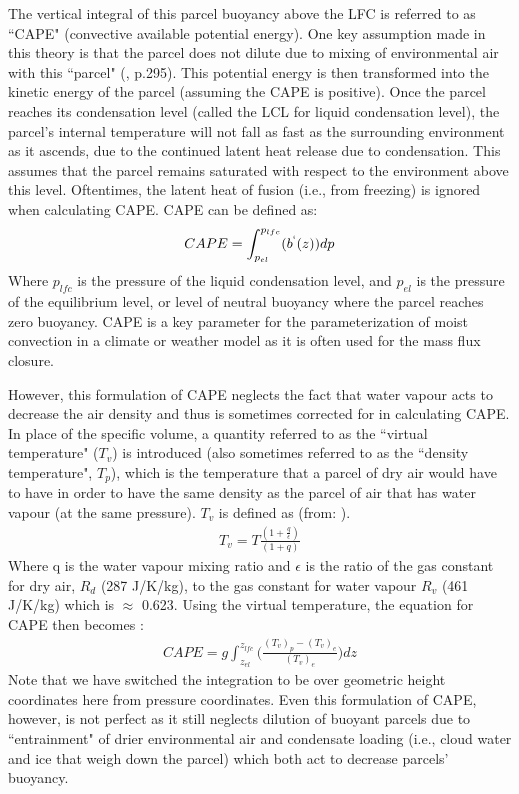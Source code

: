 \documentclass[letterpaper,12pt,titlepage,oneside,final]{book}
\begin{document}
The vertical integral of this parcel buoyancy above the LFC is referred to as ``CAPE" (convective available potential energy). One key assumption made in this theory is that the parcel does not dilute due to mixing of environmental air with this ``parcel" (\citep{holton_introduction_2004}, p.295). This potential energy is then transformed into the kinetic energy of the parcel (assuming the CAPE is positive). Once the parcel reaches its condensation level (called the LCL for liquid condensation level), the parcel's internal temperature will not fall as fast as the surrounding environment as it ascends, due to the continued latent heat release due to condensation. This assumes that the parcel remains saturated with respect to the environment above this level. Oftentimes, the latent heat of fusion (i.e., from freezing) is ignored when calculating CAPE. CAPE can be defined as: 
\begin{align}
CAPE=\int_{p_{el}}^{p_{lfc}}(b^{`}(z)){dp}
\end{align}
Where $p_{lfc}$ is the pressure of the liquid condensation level, and $p_{el}$ is the pressure of the equilibrium level, or level of neutral buoyancy where the parcel reaches zero buoyancy. CAPE is a key parameter for the parameterization of moist convection in a climate or weather model as it is often used for the mass flux closure. 

However, this formulation of CAPE neglects the fact that water vapour acts to decrease the air density and thus is sometimes corrected for in calculating CAPE. In place of the specific volume, a quantity referred to as the ``virtual temperature" ($T_{v}$) is introduced (also sometimes referred to as the ``density temperature", $T_{p}$), which is the temperature that a parcel of dry air would have to have in order to have the same density as the parcel of air that has water vapour (at the same pressure). $T_{v}$ is defined as (from: \citep{AMS_virtual_2012}).
\begin{align}
T_{v}=T\frac{(1+\frac{q}{\epsilon})}{(1+q)}
\end{align}
Where q is the water vapour mixing ratio and $\epsilon$ is the ratio of the gas constant for dry air, $R_{d}$ (287 J/K/kg), to the gas constant for water vapour $R_{v}$ (461 J/K/kg) which is $\approx$ 0.623. Using the virtual temperature, the equation for CAPE then becomes \citep{doswell_effect_1994}:
\begin{align}\label{eq:CAPE}
CAPE=g\int_{z_{el}}^{z_{lfc}}\Big(\frac{(T_{v})_{p}-(T_{v})_{e}}{(T_{v})_{e}}\Big){dz}
\end{align}
Note that we have switched the integration to be over geometric height coordinates here from pressure coordinates. Even this formulation of CAPE, however, is not perfect as it still neglects dilution of buoyant parcels due to ``entrainment" of drier environmental air and condensate loading (i.e., cloud water and ice that weigh down the parcel) which both act to decrease parcels' buoyancy.
\end{document}
